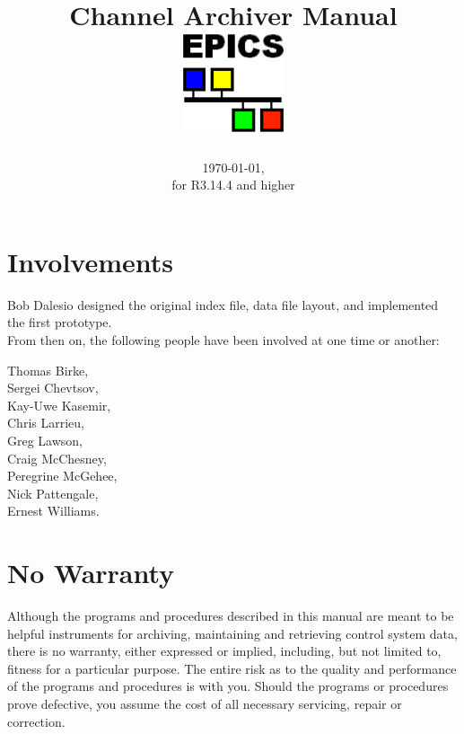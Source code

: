 \documentclass{report}
\begin{document}
\sffamily
\title{\Huge Channel Archiver Manual\\[1cm]
\includegraphics[width=3cm]{logo101}
}
\date{\today,\\ for R3.14.4 and higher}
\maketitle
\newpage

\pagestyle{empty}

\section*{Involvements}
Bob Dalesio designed the original index file, data file layout,
and implemented the first prototype.\\
From then on, the following people have been involved at one
time or another:\\
\begin{center}
Thomas Birke,\\
Sergei Chevtsov,\\
Kay-Uwe Kasemir,\\ 
Chris Larrieu,\\
Greg Lawson,\\
Craig McChesney,\\
Peregrine McGehee,\\
Nick Pattengale,\\
Ernest Williams.
\end{center}

\section*{No Warranty}
Although the programs and procedures described in this manual are
meant to be helpful instruments for archiving, maintaining and
retrieving control system data, there is no warranty, either expressed
or implied, including, but not limited to, fitness for a particular
purpose. The entire risk as to the quality and performance of the
programs and procedures is with you.  Should the programs or
procedures prove defective, you assume the cost of all necessary
servicing, repair or correction.
\end{document}
